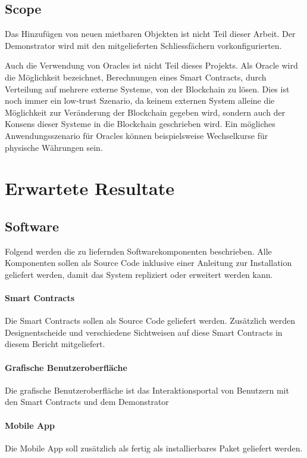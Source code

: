 \subsection{Scope}
Das Hinzufügen von neuen mietbaren Objekten ist nicht Teil dieser Arbeit. Der Demonstrator wird mit den mitgelieferten Schliessfächern vorkonfigurierten.

Auch die Verwendung von Oracles ist nicht Teil dieses Projekts. Als Oracle wird die Möglichkeit bezeichnet, Berechnungen eines Smart Contracts, durch Verteilung auf mehrere externe Systeme, von der Blockchain zu lösen. Dies ist noch immer ein low-trust Szenario, da keinem externen System alleine die Möglichkeit zur Veränderung der Blockchain gegeben wird, sondern auch der Konsens dieser Systeme in die Blockchain geschrieben wird. Ein mögliches Anwendungsszenario für Oracles können beispielsweise Wechselkurse für physische Währungen sein. \cite{blog.ethereum.org/oracles}

\section{Erwartete Resultate}
\label{sec:Erwartete_Resultate}

\subsection{Software}
Folgend werden die zu liefernden Softwarekomponenten beschrieben. Alle Komponenten sollen als Source Code inklusive einer Anleitung zur Installation geliefert werden, damit das System repliziert oder erweitert werden kann.

\paragraph{Smart Contracts}
Die Smart Contracts sollen als Source Code geliefert werden. Zusätzlich werden Designentscheide und verschiedene Sichtweisen auf diese Smart Contracts in diesem Bericht mitgeliefert.

\paragraph{Grafische Benutzeroberfläche}
Die grafische Benutzeroberfläche ist das Interaktionsportal von Benutzern mit den Smart Contracts und dem Demonstrator

\paragraph{Mobile App}
Die Mobile App soll zusätzlich als fertig als installierbares Paket geliefert werden.

